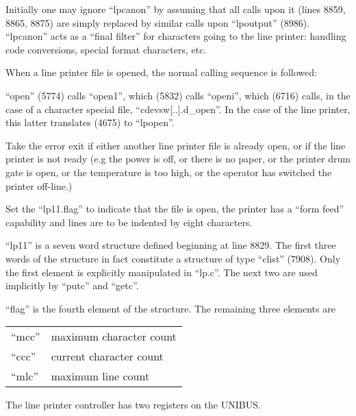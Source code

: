 Initially one may ignore ``lpcanon'' by
assuming that all calls upon it (lines
8859, 8865, 8875) are simply replaced
by similar calls upon ``lpoutput''
(8986). ``lpcanon'' acts as a ``final
filter'' for characters going to the
line printer: handling code conversions, special format characters, etc.


When a line printer file is opened, the
normal calling sequence is followed:

``open'' (5774) calls ``open1'',
which (5832) calls ``openi'', which
(6716) calls, in the case of a
character      special      file,
``cdevsw[..].d\_open''. In the case
of the line printer, this latter
translates (4675) to ``lpopen''.

\bd
\item[8853:] Take the error exit if either
another line printer file is
already open, or if the line
printer is not ready (e.g the
power is off, or there is no
paper, or the printer drum gate
is open, or the temperature is
too high, or the operator has
switched the printer off-line.)

\item[8857:] Set the ``lp11.flag'' to indicate
that the file is open, the
printer has a ``form feed'' capability and lines are to be
indented by eight characters.
\ed


\bd
\item[(a)] ``lp11'' is a seven word structure
defined beginning at line 8829. The
first three words of the structure in
fact constitute a structure of type
``clist'' (7908). Only the first element
is explicitly manipulated in ``lp.c''.
The next two are used implicitly by
``putc'' and ``getc''.

\item[(b)] ``flag'' is the fourth element of
the structure. The remaining three elements are

\begin{tabular}{ll} \\
``mcc'' &      maximum character count\\
``ccc'' &     current character count\\
``mlc'' &     maximum line count\\
\end{tabular}

\bigskip

\item[(c)] The line printer controller has
two registers on the UNIBUS.
\ed

